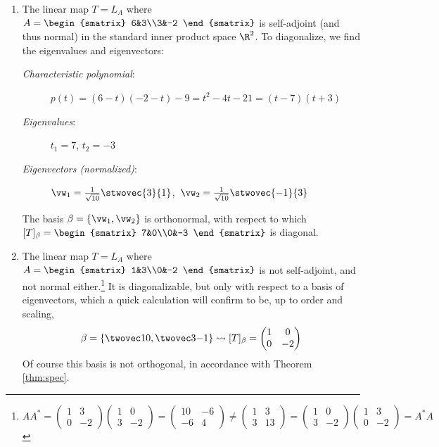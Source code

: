 \begin{examples}[label=exs:specthm]
\begin{enumerate}
	\item The linear map $T=L_A$ where $A=\begin{smatrix}
	6&3\\3&-2
	\end{smatrix}$ is self-adjoint (and thus normal) in the standard inner product space $\R^2$. To diagonalize, we find the eigenvalues and eigenvectors:
	\begin{description}
	  \item[\normalfont\emph{Characteristic polynomial}:] $p(t)=(6-t)(-2-t)-9=t^2-4t-21=(t-7)(t+3)$
	  \item[\normalfont\emph{Eigenvalues}:] $t_1=7$, $t_2=-3$
	  \item[\normalfont\emph{Eigenvectors (normalized)}:] $\vw_1=\frac 1{\sqrt{10}}\stwovec{3}{1}$,\ $\vw_2=\frac 1{\sqrt{10}}\stwovec{-1}{3}$
	\end{description}
	The basis $\beta=\{\vw_1,\vw_2\}$ is orthonormal, with respect to which $[T]_\beta=\begin{smatrix}
	7&0\\0&-3
	\end{smatrix}$ is diagonal.
	
  \item\label{ex:schur1} The linear map $T=L_A$ where $A=\begin{smatrix}
	1&3\\0&-2
	\end{smatrix}$ is not self-adjoint, and not normal either.\footnote{$AA^*=\begin{pmatrix}
	1&3\\0&-2
	\end{pmatrix}\begin{pmatrix}
	1&0\\3&-2
	\end{pmatrix}
	=
	\begin{pmatrix}
	10&-6\\-6&4
	\end{pmatrix}
	\neq \begin{pmatrix}
	1&3\\3&13
	\end{pmatrix}
	=
	\begin{pmatrix}
	1&0\\3&-2
	\end{pmatrix}\begin{pmatrix}
	1&3\\0&-2
	\end{pmatrix}
	=A^*A$}	It is diagonalizable, but only with respect to a basis of eigenvectors, which a quick calculation will confirm to be, up to order and scaling,
	\[\beta=\left\{\twovec 10,\twovec 3{-1}\right\} \rightsquigarrow [T]_\beta=\begin{pmatrix}
	1&0\\0&-2
	\end{pmatrix}\]
	Of course this basis is not orthogonal, in accordance with Theorem \ref{thm:spec}.
	

\end{enumerate}
\end{examples}
